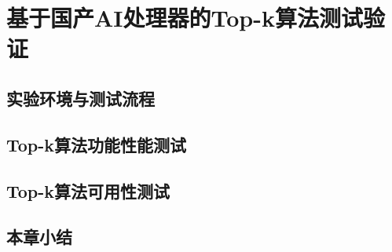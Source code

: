\chapter{基于国产AI处理器的Top-k算法测试验证}
\section{实验环境与测试流程}
\section{Top-k算法功能性能测试}
\section{Top-k算法可用性测试}
\section{本章小结}
